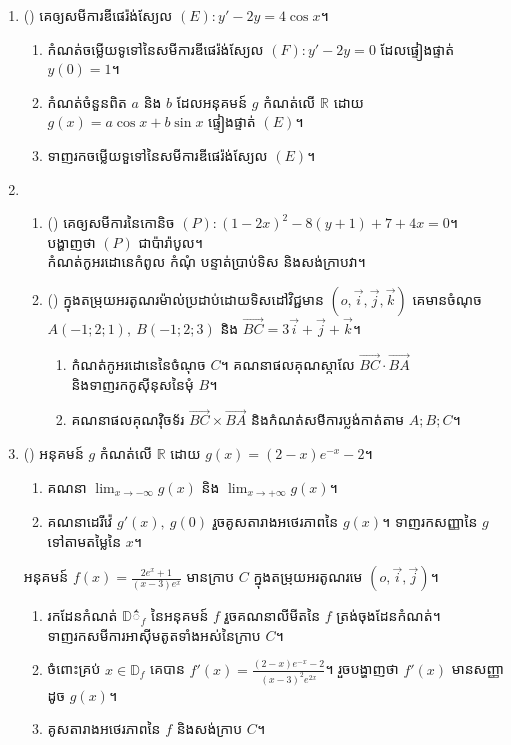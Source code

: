 \documentclass{officialexam}
\begin{document}
\begin{enumerate}[I]
\begin{enumerate}[m]
	\end{enumerate}
	\item {\color{khtug}()} គេឲ្យសមីការឌីផេរ៉ង់ស្យែល $(E): y'-2y=4\cos x$។
	\begin{enumerate}[k]
		\item កំណត់ចម្លើយទូទៅនៃសមីការឌីផេរ៉ង់ស្យែល $(F): y'-2y=0$ ដែលផ្ទៀងផ្ទាត់ $y(0)=1$។ 
		\item កំណត់ចំនួនពិត $a$ និង $b$ ដែលអនុគមន៍ $g$ កំណត់លើ $\mathbb{R}$ ដោយ $g(x)=a\cos x +b\sin x$ ផ្ទៀងផ្ទាត់ $(E)$។
		\item ទាញរកចម្លើយទួទៅនៃសមីការឌីផេរ៉ង់ស្យែល $(E)$។
	\end{enumerate}
	\item \begin{enumerate}[m]
		\item {\color{khtug}()} គេឲ្យសមីការនៃកោនិច $(P): \left(1-2x\right)^2-8\left(y+1\right)+7+4x=0$។ បង្ហាញថា $(P)$ ជាប៉ារ៉ាបូល។\\ កំណត់កូអរដោនេកំពូល កំណុំ បន្ទាត់ប្រាប់ទិស និងសង់ក្រាបវា។
		\item {\color{khtug}()} ក្នុងតម្រុយអរតូណរម៉ាល់ប្រដាប់ដោយទិសដៅវិជ្ជមាន $\left(o, \vec{i}, \vec{j}, \vec{k}\right)$ គេមានចំណុច $A\left(-1;2;1\right),~B\left(-1;2;3\right)$ និង $\overrightarrow{BC}=3\vec{i}+\vec{j}+\vec{k}$។
		\begin{enumerate}[k]
			\item កំណត់កូអរដោនេនៃចំណុច $C$។ គណនាផលគុណស្កាលែ $\overrightarrow{BC}\cdot\overrightarrow{BA}$ និងទាញរកកូសុីនុសនៃមុំ $B$។
			\item គណនាផលគុណវុិចទ័រ $\overrightarrow{BC}\times\overrightarrow{BA}$ និងកំណត់សមីការប្លង់កាត់តាម $A;B;C$។
		\end{enumerate}
	\end{enumerate}
	\item {\color{khtug}()} {\color{khtug}} អនុគមន៍ $g$ កំណត់លើ $\mathbb{R}$ ដោយ $g(x)=\left(2-x\right)e^{-x}-2$។
	\begin{enumerate}[k]
		\item គណនា $\lim_{x\to-\infty}g(x)$ និង $\lim_{x\to+\infty}g(x)$។
		\item គណនាដេរីវ៉េ $g'(x),~g(0)$ រួចគូសតារាងអថេរភាពនៃ $g(x)$។ ទាញរកសញ្ញានៃ $g$ ទៅតាមតម្លៃនៃ $x$។
	\end{enumerate}
	{\color{khtug}} អនុគមន៍ $f(x)=\frac{2e^x+1}{\left(x-3\right)e^x}$ មានក្រាប $C$ ក្នុងតម្រុយអរតូណរមេ $\left(o,\vec{i}, \vec{j}\right)$។
	\begin{enumerate}[k]
		\item រកដែនកំណត់ $\mathbb{D}៌_f$ នៃអនុគមន៍ $f$ រួចគណនាលីមីតនៃ $f$ ត្រង់ចុងដែនកំណត់។\\ ទាញរកសមីការអាសុីមតូតទាំងអស់នៃក្រាប $C$។
		\item ចំពោះគ្រប់ $x\in \mathbb{D}_f$ គេបាន $f'(x)=\frac{\left(2-x\right)e^{-x}-2}{\left(x-3\right)^2e^{2x}}$។ រួចបង្ហាញថា $f'(x)$ មានសញ្ញាដូច $g(x)$។
		\item គូសតារាងអថេរភាពនៃ $f$ និងសង់ក្រាប $C$។ 
	\end{enumerate}
\end{enumerate}
\end{document}
